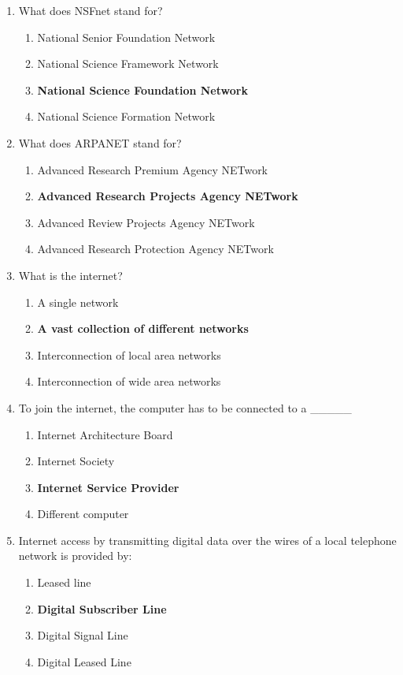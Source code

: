 \documentclass{article}
\begin{document}
\begin{enumerate}[label=\arabic*.]
    \item What does NSFnet stand for?
    \begin{enumerate}
        \item National Senior Foundation Network
        \item National Science Framework Network
        \item \textbf{National Science Foundation Network}
        \item National Science Formation Network
    \end{enumerate}

    \item What does ARPANET stand for?
    \begin{enumerate}
        \item Advanced Research Premium Agency NETwork
        \item \textbf{Advanced Research Projects Agency NETwork}
        \item Advanced Review Projects Agency NETwork
        \item Advanced Research Protection Agency NETwork
    \end{enumerate}

    \item What is the internet?
    \begin{enumerate}
        \item A single network
        \item \textbf{A vast collection of different networks}
        \item Interconnection of local area networks
        \item Interconnection of wide area networks
    \end{enumerate}

    \item To join the internet, the computer has to be connected to a \_\_\_\_\_
    \begin{enumerate}
        \item Internet Architecture Board
        \item Internet Society
        \item \textbf{Internet Service Provider}
        \item Different computer
    \end{enumerate}

    \item Internet access by transmitting digital data over the wires of a local telephone network is provided by:
    \begin{enumerate}
        \item Leased line
        \item \textbf{Digital Subscriber Line}
        \item Digital Signal Line
        \item Digital Leased Line
    \end{enumerate}


\end{enumerate}
\end{document}
